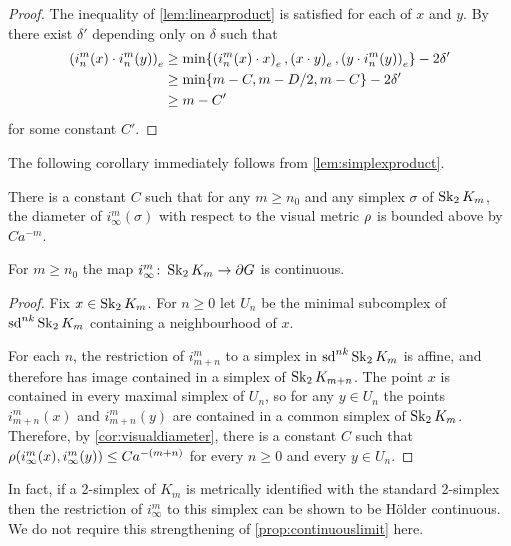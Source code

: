 \documentclass[a4paper]{article}
\begin{document}
\begin{proof}
  The inequality of \cref{lem:linearproduct} is satisfied for each of $x$ 
  and $y$. By~\cite[Proposition III.H.1.22]{bridsonhaefliger99} there exist
  $\delta'$ depending only on $\delta$ such that
  \begin{align*}
    \gromov{e}{i^m_n(x)}{i^m_n(y)} &\geq \min\{\gromov{e}{i^m_n(x)}{x}, 
    \gromov{e}{x}{y}, \gromov{e}{y}{i^m_n(y)}\} - 2\delta'\\
    &\geq \min\{m - C, m - D/2, m - C\} - 2\delta' \\
    &\geq m - C'
  \end{align*}
  for some constant $C'$.
\end{proof}

The following corollary immediately follows from \cref{lem:simplexproduct}.

\begin{corollary}\label{cor:visualdiameter}
  There is a constant $C$ such that for any $m\geq n_0$ and any simplex
  $\sigma$ of $\Skel_2 K_m$, the diameter of $i^m_{\infty}(\sigma)$ with
  respect to the visual metric $\vdistance$ is bounded above by $Ca^{-m}$.
\end{corollary}

\begin{proposition}\label{prop:continuouslimit}
  For $m\geq n_0$ the map $i^m_\infty\from \Skel_2 K_m \to \boundary G$ is
  continuous.
\end{proposition}

\begin{proof}
  Fix $x \in \Skel_2 K_m$. For $n\geq 0$ let $U_n$ be the minimal subcomplex of
  $\sd^{nk}\Skel_2 K_m$ containing a neighbourhood of $x$.

  For each $n$, the restriction of $i^m_{m+n}$ to a simplex in 
  $\sd^{nk}\Skel_2K_m$ is affine, and therefore has image contained in a 
  simplex of $\Skel_2 K_{m+n}$. The point $x$ is contained in every maximal simplex 
  of $U_n$, so for any $y \in U_n$ the points $i^m_{m+n}(x)$ and $i^m_{m+n}(y)$ 
  are contained in a common simplex of $\Skel_2K_m$. Therefore, by 
  \cref{cor:visualdiameter}, there is a constant $C$ such that 
  $\vdistance(i^m_\infty(x), i^m_\infty(y)) \leq Ca^{-(m+n)}$ for every $n \geq
  0$ and every $y \in U_n$.
\end{proof}

\begin{remark}
  In fact, if a 2-simplex of $K_m$ is metrically identified with the standard
  2-simplex then the restriction of $i^m_\infty$ to this simplex can be shown
  to be H\"{o}lder continuous.  We do not require this strengthening of
  \cref{prop:continuouslimit} here.
\end{remark}
\end{document}
